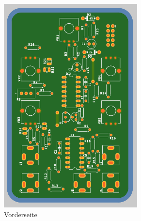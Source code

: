 \begin{figure}[h]
	\centering
	\begin{subfigure}{.5\textwidth}
		\centering
		\includegraphics[width=0.8\textwidth]{figures/VCO_Rendering_Front}
		\caption{Vorderseite}
		\label{fig:VCO_Front}
	\end{subfigure}%
	\begin{subfigure}{.5\textwidth}
		\centering

\end{subfigure}
\end{figure}
